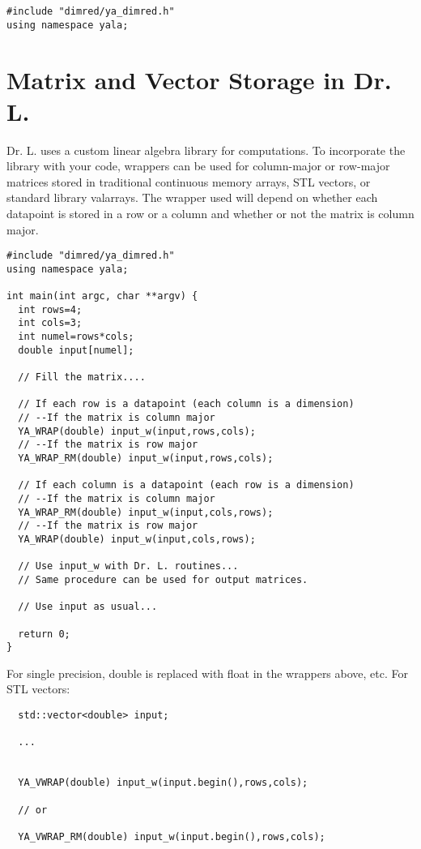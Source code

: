 \footnotesize\begin{verbatim}#include "dimred/ya_dimred.h"
using namespace yala;
\end{verbatim}
\normalsize


\par
 \par
 \hypertarget{index_vecmat}{}\section{Matrix and Vector Storage in Dr. L.}\label{index_vecmat}
Dr. L. uses a custom linear algebra library for computations. To incorporate the library with your code, wrappers can be used for column-major or row-major matrices stored in traditional continuous memory arrays, STL vectors, or standard library valarrays. The wrapper used will depend on whether each datapoint is stored in a row or a column and whether or not the matrix is column major.



\footnotesize\begin{verbatim}#include "dimred/ya_dimred.h"
using namespace yala;

int main(int argc, char **argv) {
  int rows=4;
  int cols=3;
  int numel=rows*cols;
  double input[numel];
  
  // Fill the matrix....
  
  // If each row is a datapoint (each column is a dimension)
  // --If the matrix is column major
  YA_WRAP(double) input_w(input,rows,cols);
  // --If the matrix is row major
  YA_WRAP_RM(double) input_w(input,rows,cols);
  
  // If each column is a datapoint (each row is a dimension)
  // --If the matrix is column major
  YA_WRAP_RM(double) input_w(input,cols,rows);
  // --If the matrix is row major
  YA_WRAP(double) input_w(input,cols,rows);

  // Use input_w with Dr. L. routines...
  // Same procedure can be used for output matrices.
  
  // Use input as usual...
  
  return 0;
}
\end{verbatim}
\normalsize


For single precision, double is replaced with float in the wrappers above, etc. For STL vectors:



\footnotesize\begin{verbatim}  std::vector<double> input;
  
  ...
  
  
  YA_VWRAP(double) input_w(input.begin(),rows,cols);
  
  // or
  
  YA_VWRAP_RM(double) input_w(input.begin(),rows,cols);
\end{verbatim}
\normalsize


